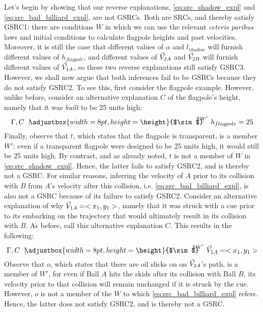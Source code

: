 \documentclass{svjour3}                     %
\newcommand{\ssim}{%
     \setbox0=\hbox{$\sim$}%
     \adjustbox{width=8pt,height=\height}{$\sim$}
}
\newcommand{\Uuparrow}{%
     \setbox0=\hbox{$\scriptstyle\Uparrow$}%
     \raisebox{.2ex}{$\scriptstyle\Uparrow$}
}
\newcommand{\nmc}{\mathbin{\mid\joinrel\!\!\ssim}}
\newcommand{\src}[4][\Gamma,]{{#1#2\,\,\mathrel{\nmc}}^{\!\!\!\!\!\!\!\Uuparrow\scriptstyle #4}\,\,#3}
\renewcommand\vec{\mathaccent"017E}
\begin{document}
Let's begin by showing that our reverse explanations, \eqref{eq:src_shadow_expl} and \eqref{eq:src_bad_billiard_expl}, are not GSRCs. Both are SRCs, and thereby satisfy GSRC1: there are conditions $W$ in which we can use the relevant \textit{ceteris paribus} laws and initial conditions to calculate flagpole heights and past velocities. Moreover, it is still the case that different values of $\alpha$ and $l_{shadow}$ will furnish different values of $h_{flagpole}$, and different values of $\vec{V}_{2A}$ and $\vec{V}_{2B}$ will furnish different values of $\vec{V}_{1A}$, so these two reverse explanations still satisfy GSRC3. However, we shall now argue that both inferences fail to be GSRCs because they do not satisfy GSRC2. \newline
\indent To see this, first consider the flagpole example. However, unlike before, consider an alternative explanation $C$ of the flagpole's height, namely that it was \textit{built} to be 25 units high:
\begin{equation} \label{eq:built_expl}
	\src{C}{h_{flagpole} = 25}{W'}
\end{equation}
Finally, observe that $t$, which states that the flagpole is transparent, is a member $W'$: even if a transparent flagpole were designed to be 25 units high, it would still be 25 units high. By contrast, and as already noted, $t$ is not a member of $W$ in \eqref{eq:src_shadow_expl}. Hence, the latter fails to satisfy GSRC2, and is thereby not a GSRC.\newline
\indent For similar reasons, inferring the velocity of $A$ prior to its collision with $B$ from $A$'s velocity after this collision, i.e. \eqref{eq:src_bad_billiard_expl}, is also not a GSRC because of its failure to satisfy GSRC2. Consider an alternative explanation of why $\vec{V}_{1A}=<x_1, y_1>$, namely that it was struck with a cue prior to its embarking on the trajectory that would ultimately result in its collision with $B$. As before, call this alternative explanation $C$. This results in the following:
\begin{equation}\label{eq:cue_expl}
	\src{C}{\vec V_{1A} = <x_1, y_1>}{W'}
\end{equation}
Observe that $o$, which states that there are oil slicks on on $\vec{V}_{2A}$'s path, is a member of $W'$, for even if Ball $A$ hits the skids after its collision with Ball $B$, its velocity prior to that collision will remain unchanged if it is struck by the cue. However, $o$ is not a member of the $W$ to which \eqref{eq:src_bad_billiard_expl} refers. Hence, the latter does not satisfy GSRC2, and is thereby not a GSRC. \newline
\end{document}
